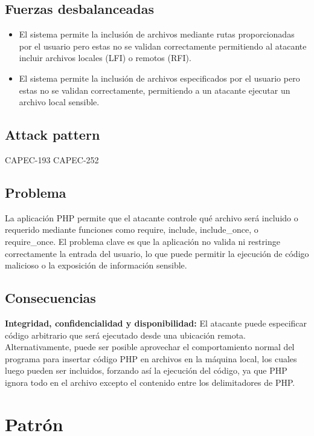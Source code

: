 \subsection{Fuerzas desbalanceadas}

\begin{itemize}
    \item El sistema permite la inclusión de archivos mediante rutas proporcionadas por el usuario pero estas no se validan correctamente permitiendo al atacante incluir archivos locales (LFI) o remotos (RFI).
    \item El sistema permite la inclusión de archivos especificados por el usuario pero estas no se validan correctamente, permitiendo a un atacante ejecutar un archivo local sensible.
\end{itemize}

\subsection{Attack pattern}

CAPEC-193
CAPEC-252

\subsection{Problema}
La aplicación PHP permite que el atacante controle qué archivo será incluido o requerido mediante funciones como require, include, include\_once, o require\_once. El problema clave es que la aplicación no valida ni restringe correctamente la entrada del usuario, lo que puede permitir la ejecución de código malicioso o la exposición de información sensible.
\subsection{Consecuencias}
\textbf{Integridad, confidencialidad y disponibilidad:} El atacante puede especificar código arbitrario que será ejecutado desde una ubicación remota. Alternativamente, puede ser posible aprovechar el comportamiento normal del programa para insertar código PHP en archivos en la máquina local, los cuales luego pueden ser incluidos, forzando así la ejecución del código, ya que PHP ignora todo en el archivo excepto el contenido entre los delimitadores de PHP.

\section{Patrón}

